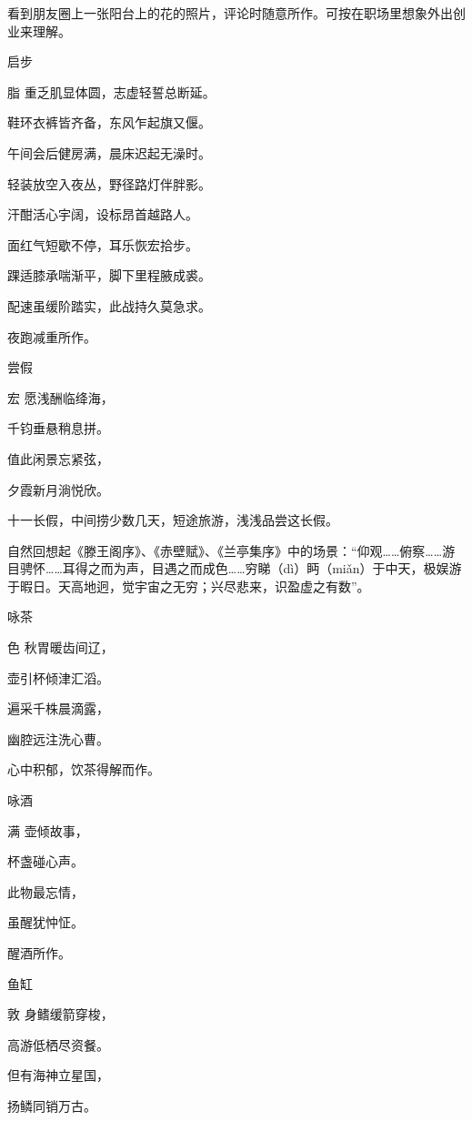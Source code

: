 \documentclass{article}
\newenvironment{poem}[3]{
\begin{minipage}{\textwidth}
\begin{pinyinscope}\begin{center}\Large\linespread{1.4}\selectfont #2\end{center}\end{pinyinscope}
\begin{pinyinscope}
	\begin{center}
	\Large\linespread{1.4}\rmfamily\selectfont #3
}{\end{center}
\end{pinyinscope}
\end{minipage}
}
\begin{document}
看到朋友圈上一张阳台上的花的照片，评论时随意所作。可按在职场里想象外出创业来理解。

\begin{poem}{}{启步}
脂重乏肌显体圆，志虚轻誓总断延。

鞋环衣裤皆齐备，东风乍起旗又偃。

午间会后健房满，晨床迟起无澡时。

轻装放空入夜丛，野径路灯伴胖影。

汗酣{}活心宇阔，设标昂首越路人。

面红气短歇不停，耳乐恢宏{}拾步。

踝适膝承喘渐平，脚下里程腋成裘。

配速虽缓阶踏实，此战持久莫急求。
\end{poem}

夜跑减重所作。

\begin{poem}{}{尝假}
宏愿浅酬临绛海，

千钧垂悬稍息拼。

值此闲景忘紧弦，

夕霞新月淌悦欣。
\end{poem}

十一长假，中间捞少数几天，短途旅游，浅浅品尝这长假。

自然回想起《滕王阁序》、《赤壁赋》、《兰亭集序》中的场景：“仰观……俯察……游目骋怀……耳得之而为声，目遇之而成色……穷睇（dì）眄（miǎn）于中天，极娱游于暇日。天高地迥，觉宇宙之无穷；兴尽悲来，识盈虚之有数”。

\begin{poem}{}{咏茶}
色秋胃暖齿间辽，

壶引杯倾津汇滔。

遍采千株晨滴露，

幽腔远注洗心曹。
\end{poem}

心中积郁，饮茶得解而作。

\begin{poem}{}{咏酒}
满壶倾故事，

杯盏碰心声。

此物最忘情，

虽醒犹忡怔。
\end{poem}

醒酒所作。

\begin{poem}{}{鱼缸}
敦身鳍缓箭穿梭，

高游低栖尽资餐。

但有海神立星国，

扬鳞同销万古{}。
\end{poem}
\end{document}
